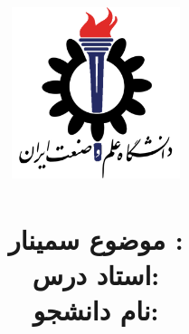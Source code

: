\title{
    \center
    \includegraphics[width=5cm, height=5cm]{images/IUST_logo_color.png} \\

\CourseName \\[20pt]

موضوع سمینار : 
\PickedSubject  \\

\textbf{استاد درس:}
\Instructor \\[10pt]

\textbf{نام دانشجو:}
\Student
}


\date{\Semester}
